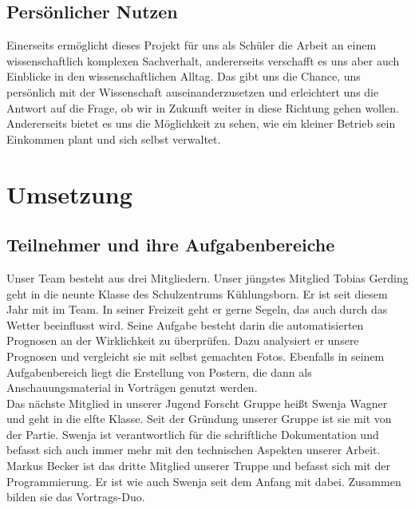 \documentclass[a4paper,oneside,12pt,titlepage]{article}
\begin{document}
    \subsection{Persönlicher Nutzen}
        Einerseits ermöglicht dieses Projekt für uns als Schüler die Arbeit an einem wissenschaftlich komplexen Sachverhalt, andererseits verschafft es uns aber auch Einblicke in den wissenschaftlichen Alltag. Das gibt uns die Chance, uns persönlich mit der Wissenschaft auseinanderzusetzen und erleichtert uns die Antwort auf die Frage, ob wir in Zukunft weiter in diese Richtung gehen wollen. Andererseits bietet es uns die Möglichkeit zu sehen, wie ein kleiner Betrieb sein Einkommen plant und sich selbst verwaltet. 

\section{Umsetzung}
    \subsection{Teilnehmer und ihre Aufgabenbereiche}
        Unser Team besteht aus drei Mitgliedern. Unser jüngstes Mitglied Tobias Gerding geht in die neunte Klasse des Schulzentrums Kühlungsborn. Er ist seit diesem Jahr mit im Team. In seiner Freizeit geht er gerne Segeln, das auch durch das Wetter beeinflusst wird. Seine Aufgabe besteht darin die automatisierten Prognosen an der Wirklichkeit zu überprüfen. Dazu analysiert er unsere Prognosen und vergleicht sie mit selbst gemachten Fotos. Ebenfalls in seinem Aufgabenbereich liegt die Erstellung von Postern, die dann als Anschauungsmaterial in Vorträgen genutzt werden. \\Das nächste Mitglied in unserer Jugend Forscht Gruppe heißt Swenja Wagner und geht in die elfte Klasse. Seit der Gründung unserer Gruppe ist sie mit von der Partie. Swenja ist verantwortlich für die schriftliche Dokumentation und befasst sich auch immer mehr mit den technischen Aspekten unserer Arbeit.\\Markus Becker ist das dritte Mitglied unserer Truppe und befasst sich mit der Programmierung. Er ist wie auch Swenja seit dem Anfang mit dabei. Zusammen bilden sie das Vortrags-Duo.
\end{document}
